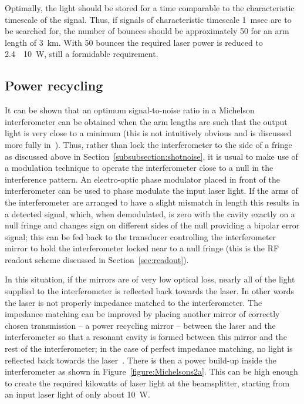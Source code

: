 \documentclass{article}
\begin{document}
Optimally, the light should be stored for a time comparable to the
characteristic timescale of the signal. Thus, if signals of characteristic
timescale 1~msec are to be searched for, the number of bounces should be
approximately 50 for an arm length of 3~km. With 50 bounces the required laser
power is reduced to 2.4~\texttimes~10~W, still a formidable
requirement.



\subsection{Power recycling}
\label{subsection:powerrec}

It can be shown that an optimum signal-to-noise ratio in a Michelson interferometer
can be obtained when the arm lengths are such that the output light is very
close to a minimum (this is not intuitively obvious and is discussed more fully
in~\cite{Edelstein}). Thus, rather than lock the interferometer to the side of a
fringe as discussed above in Section~\ref{subsubsection:shotnoise}, it is usual
to make use of a modulation technique to operate the interferometer close to a
null in the interference pattern. An electro-optic phase modulator placed in
front of the interferometer can be used to phase modulate the input laser light.
If the arms of the interferometer are arranged to have a slight mismatch in
length this results in a detected signal, which, when demodulated, is zero with
the cavity exactly on a null fringe and changes sign on different sides of the
null providing a bipolar error signal; this can be fed back to the transducer
controlling the interferometer mirror to hold the interferometer locked near to
a null fringe (this is the RF readout scheme discussed in Section~\ref{sec:readout}).

In this situation, if the mirrors are of very low optical loss, nearly all of the
light supplied to the interferometer is reflected back towards the laser. In
other words the laser is not properly impedance matched to the interferometer.
The impedance matching can be improved by placing another mirror of correctly
chosen transmission -- a power recycling mirror -- between the laser and the
interferometer so that a resonant cavity is formed between this mirror and the
rest of the interferometer; in the case of perfect impedance matching, no light
is reflected back towards the laser~\cite{Drever3, Schilling}. There is then a
power build-up inside the interferometer as shown in 
Figure~\ref{figure:Michelsons2a}. This can be high enough to create the required
kilowatts of laser light at the beamsplitter, starting from an input laser light
of only about 10~W.
\end{document}
